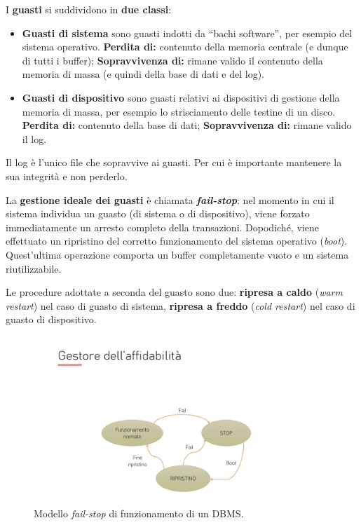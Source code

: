 \documentclass[a4paper]{article}
\newcommand{\dquotes}[1]{``#1''}
\begin{document}
	I \textbf{guasti} si suddividono in \textbf{due classi}:
	\begin{itemize}
		\item \textcolor{Red3}{\textbf{Guasti di sistema}} sono guasti indotti da \dquotes{bachi software}, per esempio del sistema operativo.\newline
		\textbf{Perdita di:} contenuto della memoria centrale (e dunque di tutti i buffer);\newline
		\textbf{Sopravvivenza di:} rimane valido il contenuto della memoria di massa (e quindi della base di dati e del log).
		
		\item \textcolor{Red3}{\textbf{Guasti di dispositivo}} sono guasti relativi ai dispositivi di gestione della memoria di massa, per esempio lo strisciamento delle testine di un disco.\newline
		\textbf{Perdita di:} contenuto della base di dati;\newline
		\textbf{Sopravvivenza di:} rimane valido il log.
	\end{itemize}
	Il log è l'unico file che sopravvive ai guasti. Per cui è importante mantenere la sua integrità e non perderlo.\newline
	
	\noindent
	La \textbf{gestione ideale dei guasti} è chiamata \textcolor{Red3}{\textbf{\emph{fail-stop}}}: nel momento in cui il sistema individua un guasto (di sistema o di dispositivo), viene forzato immediatamente un arresto completo della transazioni. Dopodiché, viene effettuato un ripristino del corretto funzionamento del sistema operativo (\emph{boot}). Quest'ultima operazione comporta un buffer completamente vuoto e un sistema riutilizzabile.\newline
	
	\noindent
	Le procedure adottate a seconda del guasto sono due: \textbf{ripresa a caldo} (\emph{warm restart}) nel caso di guasto di sistema, \textbf{ripresa a freddo} (\emph{cold restart}) nel caso di guasto di dispositivo.
	\begin{figure}[!htp]
		\centering
		\includegraphics[width=\textwidth]{img/modello_fail-stop.pdf}
		\caption{Modello \emph{fail-stop} di funzionamento di un DBMS.}
	\end{figure}\newpage
\end{document}
